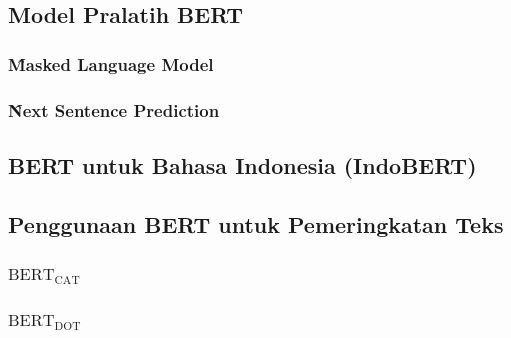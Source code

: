	\subsection{Model Pralatih BERT}

		\subsubsection{\f{Masked Language Model}}
		

		\subsubsection{\f{Next Sentence Prediction}}

	\subsection{BERT untuk Bahasa Indonesia (IndoBERT)}

	\subsection{Penggunaan BERT untuk Pemeringkatan Teks}
		\subsubsection{$\text{BERT}_{\text{CAT}}$}

		\subsubsection{$\text{BERT}_{\text{DOT}}$}




